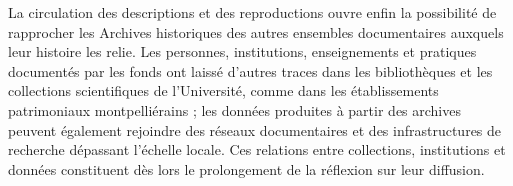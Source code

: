 La circulation des descriptions et des reproductions ouvre enfin la possibilité de rapprocher les Archives historiques des autres ensembles documentaires auxquels leur histoire les relie. Les personnes, institutions, enseignements et pratiques documentés par les fonds ont laissé d'autres traces dans les bibliothèques et les collections scientifiques de l'Université, comme dans les établissements patrimoniaux montpelliérains ; les données produites à partir des archives peuvent également rejoindre des réseaux documentaires et des infrastructures de recherche dépassant l'échelle locale. Ces relations entre collections, institutions et données constituent dès lors le prolongement de la réflexion sur leur diffusion.